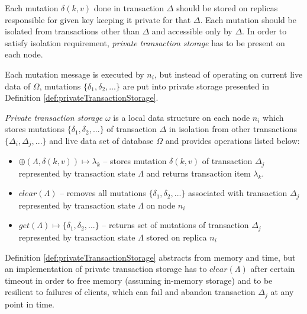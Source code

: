 \documentclass[runningheads,a4paper]{llncs}
\newcommand{\transaction}{$\Delta$\xspace}
\newcommand{\transactionj}{$\Delta_{j}$\xspace}
\newcommand{\transactions}{$\{\Delta_{i}, \Delta_{j}, ...\}$\xspace}
\newcommand{\database}{$\Omega$\xspace}
\newcommand{\mutation}[2]{$\delta(#1, #2)$\xspace}
\newcommand{\mutations}{$\{\delta_{1}, \delta_{2}, ...\}$\xspace}
\newcommand{\txItemi}[1]{$\lambda_{#1}$\xspace}
\newcommand{\txState}{$\Lambda$\xspace}
\newcommand{\txStorage}{$\omega$\xspace}
\newcommand{\node}[1]{$n_{#1}$\xspace}
\begin{document}
Each mutation \mutation{k}{v} done in transaction \transaction should be stored on replicas responsible for given key keeping it private for that \transaction. Each mutation should be isolated from transactions other than \transaction and accessible only by \transaction. In order to satisfy isolation requirement, \emph{private transaction storage} has to be present on each node. 

Each mutation message is executed by \node{i}, but instead of operating on current live data of \database, mutations \mutations are put into private storage presented in Definition \ref{def:privateTransactionStorage}. 

\begin{definition}
  \label{def:privateTransactionStorage}
  \emph{Private transaction storage} \txStorage is a local data structure on each node \node{i} which stores mutations \mutations of transaction \transaction in isolation from other transactions \transactions and live data set of database \database and provides operations listed below: 
  \begin{itemize}
    \item $\oplus(\text{\txState}, \text{\mutation{k}{v}}) \mapsto \text{\txItemi{k}}$ -- stores mutation \mutation{k}{v} of transaction \transactionj represented by transaction state \txState and returns transaction item \txItemi{k}. 
    \item $\mathit{clear}(\text{\txState})$ -- removes all mutations \mutations associated with transaction \transactionj represented by transaction state \txState on node \node{i}
    \item $\mathit{get}(\text{\txState}) \mapsto \text{\mutations}$ -- returns set of mutations of transaction \transactionj represented by transaction state \txState stored on replica \node{i} 
  \end{itemize}
\end{definition}

Definition \ref{def:privateTransactionStorage} abstracts from memory and time, but an implementation of private transaction storage has to $\mathit{clear}(\text{\txState})$ after certain timeout in order to free memory (assuming in-memory storage) and to be resilient to failures of clients, which can fail and abandon transaction \transactionj at any point in time. 
\end{document}
